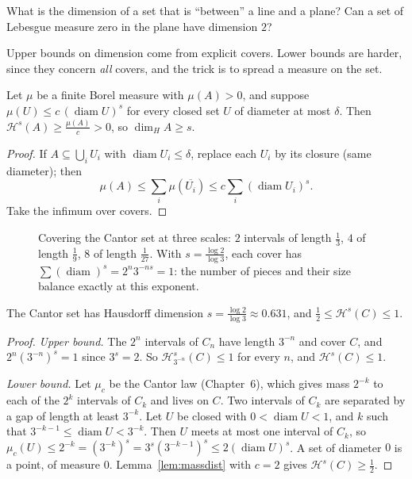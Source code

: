 \begin{think}
What is the dimension of a set that is ``between'' a line and a plane? Can a set of Lebesgue measure zero in the plane have dimension $2$?
\end{think}

Upper bounds on dimension come from explicit covers. Lower bounds are harder, since they concern \emph{all} covers, and the trick is to spread a measure on the set.

\begin{lemma}\label{lem:massdist}
Let $\mu$ be a finite Borel measure with $\mu(A)>0$, and suppose $\mu(U)\le c\,(\operatorname{diam}U)^s$ for every closed set $U$ of diameter at most $\delta$. Then $\mathcal H^s(A)\ge\frac{\mu(A)}c>0$, so $\dim_HA\ge s$.
\end{lemma}
\begin{proof}
If $A\subseteq\bigcup_iU_i$ with $\operatorname{diam}U_i\le\delta$, replace each $U_i$ by its closure (same diameter); then \[\mu(A)\le\sum_i\mu(\overline{U_i})\le c\sum_i(\operatorname{diam}U_i)^s.\] Take the infimum over covers.
\end{proof}

\begin{figure}[ht]
\centering
{}
\caption{Covering the Cantor set at three scales: $2$ intervals of length $\frac13$, $4$ of length $\frac19$, $8$ of length $\frac1{27}$. With $s=\frac{\log2}{\log3}$, each cover has $\sum(\operatorname{diam})^s=2^n3^{-ns}=1$: the
number of pieces and their size balance exactly at this exponent.}
\label{fig:cantorcover}
\end{figure}

\begin{theorem}\label{thm:cantordim}
The Cantor set has Hausdorff dimension $s=\frac{\log2}{\log3}\approx0.631$, and $\frac12\le\mathcal H^s(C)\le1$.
\end{theorem}
\begin{proof}
\emph{Upper bound.} The $2^n$ intervals of $C_n$ have length $3^{-n}$ and cover $C$, and $2^n(3^{-n})^s=1$ since $3^s=2$. So $\mathcal H^s_{3^{-n}}(C)\le1$ for every $n$, and $\mathcal H^s(C)\le1$.

\emph{Lower bound.} Let $\mu_c$ be the Cantor law (Chapter~6), which gives mass $2^{-k}$ to each of the $2^k$ intervals of $C_k$ and lives on $C$. Two intervals of $C_k$ are separated by a gap of length at least $3^{-k}$.
Let $U$ be closed with $0<\operatorname{diam}U<1$, and $k$ such that $3^{-k-1}\le\operatorname{diam}U<3^{-k}$. Then $U$ meets at most one interval of $C_k$, so
$\mu_c(U)\le2^{-k}=(3^{-k})^s=3^s(3^{-k-1})^s\le2(\operatorname{diam}U)^s$. A set of diameter $0$ is a point, of measure $0$. Lemma~\ref{lem:massdist} with $c=2$ gives $\mathcal H^s(C)\ge\frac12$.
\end{proof}

